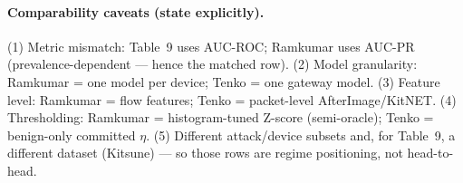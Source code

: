 \documentclass[10pt]{article}
\begin{document}
\paragraph{Comparability caveats (state explicitly).}
(1) Metric mismatch: Table~9 uses AUC-ROC; Ramkumar uses AUC-PR (prevalence-dependent ---
hence the matched row). (2) Model granularity: Ramkumar = one model per device; Tenko = one
gateway model. (3) Feature level: Ramkumar = flow features; Tenko = packet-level
AfterImage/KitNET. (4) Thresholding: Ramkumar = histogram-tuned Z-score (semi-oracle);
Tenko = benign-only committed $\eta$. (5) Different attack/device subsets and, for Table~9, a
different dataset (Kitsune) --- so those rows are regime positioning, not head-to-head.
\end{document}
